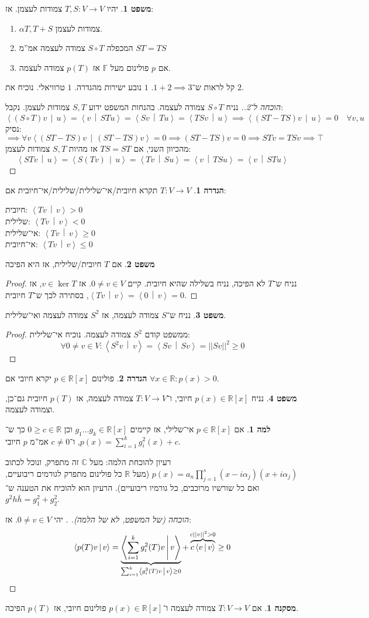 \documentclass[a4paper]{article}
\newcommand\R     {\mathbb{R}}
\newcommand\C     {\mathbb{C}}
\newcommand\ra    {\rangle}
\newcommand\la    {\langle}
\newcommand\F         {\mathbb{F}}
\newcommand\co        {\colon}
\newcommand\norm[1]   {\left \vert \left \vert #1 \right \vert \right \vert}
\newcommand\mut [2]   {\left \la #1 \,\middle\vert\, #2 \right \ra}
\newcommand\ag        {\alpha}
\theoremstyle{definition}
\newtheorem{Theorem}{\color{myblue}משפט}
\newtheorem{Definition}{\color{mygreen}הגדרה}
\newtheorem{Lemma}{\color{myyellow}למה}
\newtheorem{Collary}{\color{mymagenta}מסקנה}
\newcommand\cola [1] {\begin{Collary}#1\end{Collary}}
\newcommand\theo  [1] {\begin{Theorem}#1\end{Theorem}}
\newcommand\defi  [1] {\begin{Definition}#1\end{Definition}}
\newcommand\lem   [1] {\begin{Lemma}#1\end{Lemma}}
\begin{document}
	\theo{יהיו $T, S \co V \to V$ צמודות לעצמן. אז: 
		\begin{enumerate}
			\item $\ag T, T + S$ צמודות לעצמן. 
			\item המכפלה $S\circ T$ צמודה לעצמה אמ''מ $ST = TS$
			\item אם $p$ פולינום מעל $\F$ אז $p(T)$ צמודה לעצמה. 
	\end{enumerate}}
	קל לראות ש־$1 + 2 \implies 3$. $1$ נובע ישירות מהגדרה. $1$ טרוויאלי. נוכיח את $2$. \begin{proof}[הוכחה ל־2.]
		נניח $S \circ T$ צמודה לעצמה. בהנחות המשפט ידוע $S, T$ צמודות לעצמן. נקבל: 
		\[ \mut{(S \circ T)v}{u} = \mut{v}{STu} = \mut{Sv}{Tu} = \mut{TSv}{u} \implies \mut{(ST - TS)v}{u} = 0 \quad \forall v, u \]
		נסיק: 
		\[ \implies \forall v\mut{(ST - TS)v}{(ST - TS)v} = 0  \implies (ST - TS)v = 0 \implies STv = TSv \implies \top \]
		מהכיוון השני, אם $TS = ST$ אז מהיות $S, T$ צמודות לעצמן: 
		\[ \mut{STv}{u} = \mut{S(Tv)}{u} = \mut{Tv}{Su} = \mut{v}{TSu} = \mut{v}{STu} \]
	\end{proof}
	\defi{$T \co V \to V$ תקרא חיובית/אי־שלילית/שלילית/אי־חיובית אם: 
		\begin{multicols}{2}
				 חיובית: $\mut{Tv}{v} > 0$ \\
				שלילית: $\mut{Tv}{v} < 0$ \\
				אי־שלילית: $\mut{Tv}{v} \ge 0$ \\
				אי־חיובית: $\mut{Tv}{v} \le 0$
		\end{multicols}
	}
	\theo{אם $T$ חיובית/שלילית, אז היא הפיכה} \begin{proof}
		נניח ש־$T$ לא הפיכה, נניח בשלילה שהיא חיובית. קיים $0 \neq v \in V$. אז $v \in \ker T$, אז $\mut{Tv}{v} = \mut{0}{v} = 0$, בסתירה לכך ש־$T$ חיובית. 
	\end{proof}
	\theo{נניח ש־$S$ צמודה לעצמה, אז $S^{2}$ צמודה לעצמה ואי־שלילית. }
	\begin{proof}
		ממשפט קודם $S^{2}$ צמודה לעצמה. נוכיח אי־שלילית: 
		\[ \forall 0 \neq v \in V \co \mut{S^{2}v}{v} = \mut{Sv}{Sv} = \norm{Sv}^{2} \ge 0 \]
	\end{proof}
	\defi{פולינום $p \in \R[x]$ יקרא חיובי אם $\forall x \in \R\co p(x) > 0$. }
	\theo{נניח $p(x) \in \R[x]$ חיובי, ו־$T \co V \to V$ צמודה לעצמה, אז $p(T)$ חיובית גם־כן, וצמודה לעצמה. }
	\lem{אם $p \in \R[x]$ אי־שלילי, אז קיימים $g_1 \dots g_k \in \R[x]$ וכן $0 \ge c \in \R$ כך ש־$p(x) = \sum_{i = 1}^{k}g^2_i(x) + c$, ו־$c \neq 0$ אמ''מ $p$ חיובי. }
	רעיון להוכחת הלמה: מעל $\C$ זה מתפרק, ונוכל לכתוב $p(x) = a_n\prod_{j = 1}^{s} (x - i\ag_j)(x + i\ag_j)$ (מעל $\R$ כל פולינום מתפרק לגורמים ריבועיים, ואם כל שורשיו מרוכבים, כל גורמיו ריבועיים). הרעיון הוא להוכיח את הטענה ש־$g^2 h \bar h = g_1^2 + g_2^2$.
	\begin{proof}[הוכחה (של המשפט, לא של הלמה). ]
		יהי $0 \neq v \in V$. אז: 
		\[ \mut{p(T)v}{v} = \underbrace{\mut{\sum_{i = 1}^{k}g_i^2(T)v}{v}}_{\mathclap{\sum_{i = 1}^{k} \mut{g_i^2(T)v}{v}\ge 0}} + \overbrace{c\mut{v}{v}}^{c\norm{v}^2 > 0} \ge 0 \]
	\end{proof}
	\cola{אם $T \co V \to V$ צמודה לעצמה ו־$p(x) \in \R[x]$ פולינום חיובי, אז $p(T)$ הפיכה. }
	
\end{document}
